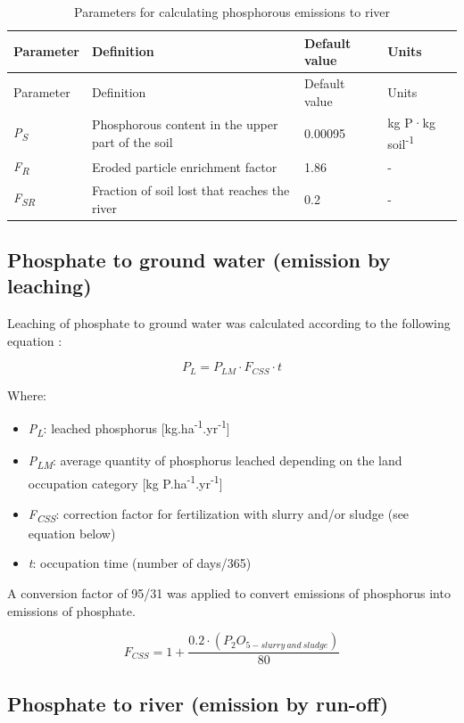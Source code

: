 \documentclass[openany]{book}
\begin{document}
\begin{longtable}[]{@{}llll@{}}
\caption{\label{tab:phosphorous-river} Parameters for calculating phosphorous emissions to river \citep{prasuhn2006}}\tabularnewline
\toprule
Parameter & Definition & Default value & Units\tabularnewline
\midrule
\endfirsthead
\toprule
Parameter & Definition & Default value & Units\tabularnewline
\midrule
\endhead
\emph{P\textsubscript{S}} & Phosphorous content in the upper part of the soil & 0.00095 & kg P·kg soil\textsuperscript{-1}\tabularnewline
\emph{F\textsubscript{R}} & Eroded particle enrichment factor & 1.86 & -\tabularnewline
\emph{F\textsubscript{SR}} & Fraction of soil lost that reaches the river & 0.2 & -\tabularnewline
\bottomrule
\end{longtable}

\hypertarget{phosphate-to-ground-water-emission-by-leaching}{%
\subsection{Phosphate to ground water (emission by leaching)}\label{phosphate-to-ground-water-emission-by-leaching}}

Leaching of phosphate to ground water was calculated according to the following equation \citep{prasuhn2006}:

\[P_L=P_{LM} \cdot F_{CSS} \cdot t\]

Where:

\begin{itemize}
\item
  \emph{P\textsubscript{L}}: leached phosphorus {[}kg.ha\textsuperscript{-1}.yr\textsuperscript{-1}{]}
\item
  \emph{P\textsubscript{LM}}: average quantity of phosphorus leached depending on the land occupation category {[}kg P.ha\textsuperscript{-1}.yr\textsuperscript{-1}{]}
\item
  \emph{F\textsubscript{CSS}}: correction factor for fertilization with slurry and/or sludge (see equation below)
\item
  \emph{t}: occupation time (number of days/365)
\end{itemize}

A conversion factor of 95/31 was applied to convert emissions of phosphorus into emissions of phosphate.

\[F_{CSS}=1+ \frac{0.2 \cdot (P_2O_{5-slurry\: and\: sludge})}{80}\]

\hypertarget{phosphate-to-river-emission-by-run-off}{%
\subsection{Phosphate to river (emission by run-off)}\label{phosphate-to-river-emission-by-run-off}}
\end{document}

